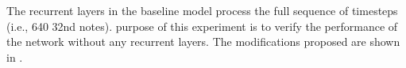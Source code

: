 
The recurrent layers in the baseline model process the full
sequence of timesteps (i.e., 640 \gls{32nd} notes). purpose
of this experiment is to verify the performance of the
network without any recurrent layers. The modifications
proposed are shown in .

